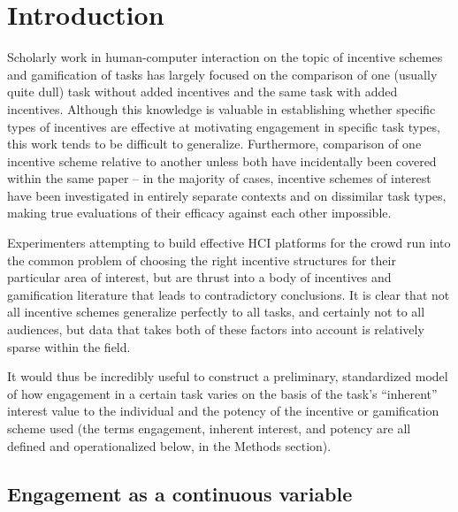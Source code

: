 \section{Introduction}

Scholarly work in human-computer interaction on the topic of incentive schemes and gamification of tasks has largely focused on the comparison of one (usually quite dull) task without added incentives and the same task with added incentives. Although this knowledge is valuable in establishing whether specific types of incentives are effective at motivating engagement in specific task types, this work tends to be difficult to generalize. Furthermore, comparison of one incentive scheme relative to another unless both have incidentally been covered within the same paper -- in the majority of cases, incentive schemes of interest have been investigated in entirely separate contexts and on dissimilar task types, making true evaluations of their efficacy against each other impossible.

Experimenters attempting to build effective HCI platforms for the crowd run into the common problem of choosing the right incentive structures for their particular area of interest, but are thrust into a body of incentives and gamification literature that leads to contradictory conclusions. It is clear that not all incentive schemes generalize perfectly to all tasks, and certainly not to all audiences, but data that takes both of these factors into account is relatively sparse within the field.

It would thus be incredibly useful to construct a preliminary, standardized model of how engagement in a certain task varies on the basis of the task's “inherent” interest value to the individual and the potency of the incentive or gamification scheme used (the terms engagement, inherent interest, and potency are all defined and operationalized below, in the Methods section). 

\subsection{Engagement as a continuous variable}

